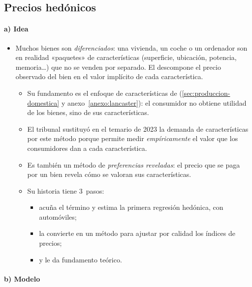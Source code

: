 \documentclass[11pt]{article}
\begin{document}
\subsection{Precios hedónicos}\label{sec:precios-hedonicos}

\paragraph{a) Idea}

\begin{itemize}
\item Muchos bienes son \emph{diferenciados}: una vivienda, un coche o un ordenador son en realidad «paquetes» de características (superficie, ubicación, potencia, memoria\dots) que no se venden por separado. El  descompone el precio observado del bien en el valor implícito de cada característica.
  \begin{itemize}
  \item Su fundamento es el enfoque de características de  (\ref{sec:produccion-domestica} y anexo~\ref{anexo:lancaster}): el consumidor no obtiene utilidad de los bienes, sino de sus características.
  \item El tribunal sustituyó en el temario de 2023 la demanda de características por este método porque permite medir \emph{empíricamente} el valor que los consumidores dan a cada característica.
  \item Es también un método de \emph{preferencias reveladas}: el precio que se paga por un bien revela cómo se valoran sus características.
  \item Su historia tiene 3~pasos:
    \begin{itemize}
    \item \textcite{Court1939Hedonic} acuña el término y estima la primera regresión hedónica, con automóviles\nocite{Goodman1998Court};
    \item \textcite{Griliches1961Hedonic} la convierte en un método para ajustar por calidad los índices de precios\nocite{Griliches1971Price};
    \item y \textcite{Rosen1974Hedonic} le da fundamento teórico.
    \end{itemize}
  \end{itemize}
\end{itemize}

\paragraph{b) Modelo}
\end{document}
